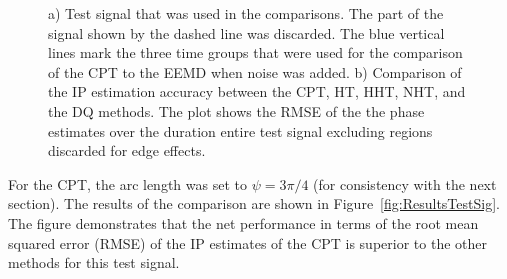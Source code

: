 \documentclass[11pt,draftcls,onecolumn]{IEEEtran}
\begin{document}
\begin{figure}[ht]
	\centering
	\caption{a) Test signal that was used in the comparisons. The part of the signal shown by the dashed line was discarded. The blue vertical lines mark the three time groups that were used for the comparison of the CPT to the EEMD when noise was added. b) Comparison of the IP estimation accuracy between the CPT, HT, HHT, NHT, and the DQ methods. The plot shows the RMSE of the the phase estimates over the duration entire test signal excluding regions discarded for edge effects.}
\end{figure}

For the CPT, the arc length was set to $\psi=3\pi/4$ (for consistency with the next section). The results of the comparison are shown in Figure~\ref{fig:ResultsTestSig}. The figure demonstrates that the net performance in terms of the root mean squared error (RMSE) of the IP estimates of the CPT is superior to the other methods for this test signal.
\end{document}
